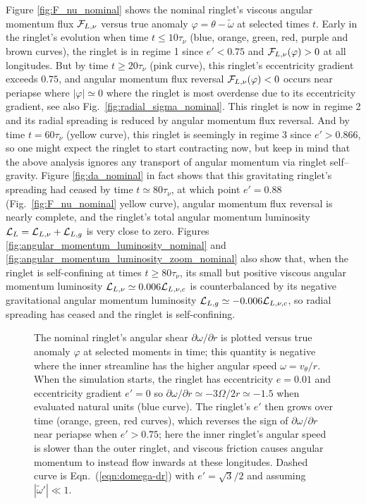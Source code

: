 \documentclass[preprint]{aastex62}
\begin{document}
Figure \ref{fig:F_nu_nominal} shows the nominal ringlet's viscous angular momentum flux
${\cal F}_{L,\nu}$ versus true anomaly $\varphi=\theta-\tilde{\omega}$ at selected times $t$.
Early in the ringlet's evolution when time $t \le 10\tau_\nu$ (blue, orange, green, red, purple 
and brown curves),
the ringlet is in regime 1 since $e'<0.75$ and ${\cal F}_{L,\nu}(\varphi)>0$ at all longitudes.
But by time $t \ge 20\tau_\nu$ (pink curve), this ringlet's eccentricity gradient exceeds $0.75$,
and angular momentum flux reversal ${\cal F}_{L,\nu}(\varphi)<0$ occurs near periapse where $|\varphi|\simeq0$
where the ringlet is most overdense due to its eccentricity gradient, see 
also Fig.\ \ref{fig:radial_sigma_nominal}.
This ringlet is now in regime 2 and its radial spreading is reduced by angular momentum flux reversal. 
And by time $t = 60\tau_\nu$ (yellow curve), this ringlet is seemingly in regime 3
since $e'>0.866$, so one might expect the ringlet to start contracting
now, but keep in mind that the above analysis ignores any transport
of angular momentum via ringlet self--gravity. Figure \ref{fig:da_nominal} in fact
shows that this gravitating ringlet's spreading had ceased by time $t \simeq80\tau_\nu$, 
at which point $e'=0.88$ (Fig.\ \ref{fig:F_nu_nominal} yellow curve), angular momentum flux reversal is nearly complete,
and the ringlet's total angular momentum luminosity ${\cal L}_L={\cal L}_{L,\nu}+{\cal L}_{L,g}$ is very close to zero.
Figures \ref{fig:angular_momentum_luminosity_nominal} and \ref{fig:angular_momentum_luminosity_zoom_nominal} also show that, 
when the ringlet is self-confining at times $t\ge 80\tau_\nu$, 
its small but positive viscous angular momentum luminosity ${\cal L}_{L,\nu}\simeq0.006{\cal L}_{L,\nu,c}$ 
is counterbalanced by its negative gravitational angular momentum luminosity ${\cal L}_{L,g}\simeq -0.006{\cal L}_{L,\nu,c}$,
so radial spreading has ceased and the ringlet is self-confining. 

\begin{figure}
    \caption{
        \label{fig:nominal_shear}
        The nominal ringlet's angular shear $\partial\omega/\partial r$ is plotted versus true 
        anomaly $\varphi$ at selected moments in time; this quantity is negative where the inner streamline
        has the higher angular speed $\omega=v_\theta/r$. When the simulation starts, the
        ringlet has eccentricity $e=0.01$ and eccentricity gradient $e'=0$ 
        so $\partial\omega/\partial r\simeq-3\Omega/2r\simeq-1.5$ when evaluated natural units (blue curve).
        The ringlet's $e'$ then grows over time (orange, green, red curves),
        which reverses the sign of $\partial\omega/\partial r$
        near periapse when $e'>0.75$; here the inner ringlet's angular speed
        is slower than the outer ringlet, and viscous friction causes angular momentum to instead flow inwards
        at these longitudes. Dashed curve is Eqn.\ (\ref{eqn:domega-dr}) with $e'=\sqrt{3}/2$
        and assuming $|\tilde{\omega}'|\ll1$.
    }
\end{figure}
\end{document}
